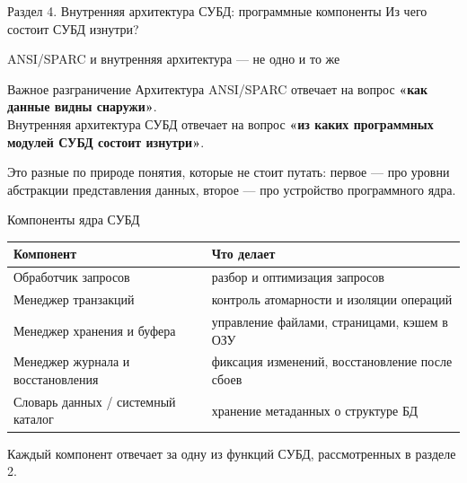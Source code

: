 \documentclass[aspectratio=169]{beamer}
\begin{document}

\begin{frame}{Раздел 4. Внутренняя архитектура СУБД: программные компоненты}
\centering
\Large
Из чего состоит СУБД изнутри?
\end{frame}


\begin{frame}{ANSI/SPARC и внутренняя архитектура — не одно и то же}

\begin{block}{Важное разграничение}
Архитектура ANSI/SPARC отвечает на вопрос
\textbf{«как данные видны снаружи»}.\\[4pt]
Внутренняя архитектура СУБД отвечает на вопрос
\textbf{«из каких программных модулей СУБД состоит изнутри»}.
\end{block}

\vspace{0.4cm}

Это разные по природе понятия, которые не стоит путать:
первое — про уровни абстракции представления данных,
второе — про устройство программного ядра.

\end{frame}


\begin{frame}{Компоненты ядра СУБД}

\small
\begin{table}
\centering
\begin{tabular}{p{}|p{}}
\toprule
\textbf{Компонент} & \textbf{Что делает}\\
\midrule
Обработчик запросов & разбор и оптимизация запросов\\
Менеджер транзакций & контроль атомарности и изоляции операций\\
Менеджер хранения и буфера & управление файлами, страницами, кэшем в ОЗУ\\
Менеджер журнала и восстановления & фиксация изменений, восстановление после сбоев\\
Словарь данных / системный каталог & хранение метаданных о структуре БД\\
\bottomrule
\end{tabular}
\end{table}

\vspace{0.3cm}
\footnotesize
Каждый компонент отвечает за одну из функций СУБД,
рассмотренных в разделе 2.

\end{frame}
\end{document}
